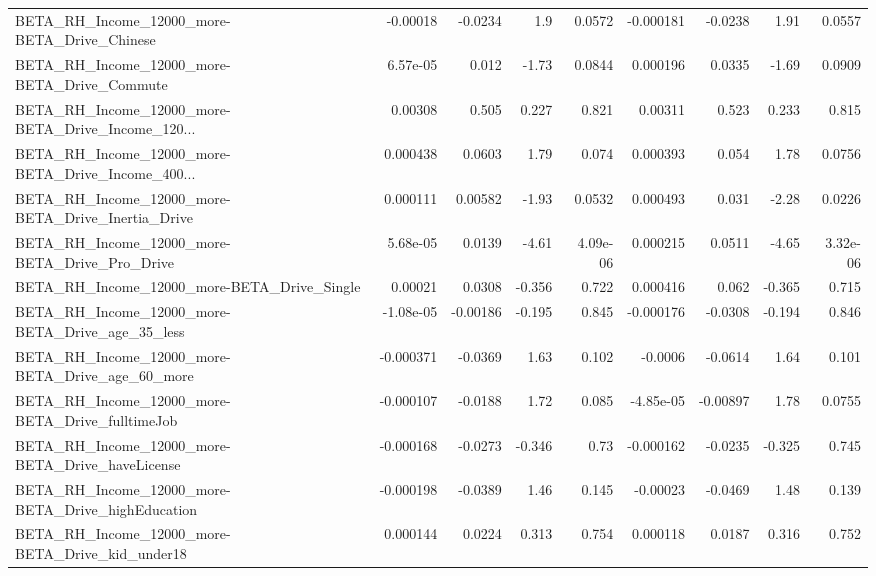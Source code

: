 \begin{tabular}{lrrrrrrrr}
BETA\_RH\_Income\_12000\_more-BETA\_Drive\_Chinese       &    -0.00018 &      -0.0234 &      1.9 &   0.0572 &  -0.000181 &     -0.0238 &         1.91 &        0.0557 \\
BETA\_RH\_Income\_12000\_more-BETA\_Drive\_Commute       &    6.57e-05 &        0.012 &    -1.73 &   0.0844 &   0.000196 &      0.0335 &        -1.69 &        0.0909 \\
BETA\_RH\_Income\_12000\_more-BETA\_Drive\_Income\_120... &     0.00308 &        0.505 &    0.227 &    0.821 &    0.00311 &       0.523 &        0.233 &         0.815 \\
BETA\_RH\_Income\_12000\_more-BETA\_Drive\_Income\_400... &    0.000438 &       0.0603 &     1.79 &    0.074 &   0.000393 &       0.054 &         1.78 &        0.0756 \\
BETA\_RH\_Income\_12000\_more-BETA\_Drive\_Inertia\_Drive &    0.000111 &      0.00582 &    -1.93 &   0.0532 &   0.000493 &       0.031 &        -2.28 &        0.0226 \\
BETA\_RH\_Income\_12000\_more-BETA\_Drive\_Pro\_Drive     &    5.68e-05 &       0.0139 &    -4.61 & 4.09e-06 &   0.000215 &      0.0511 &        -4.65 &      3.32e-06 \\
BETA\_RH\_Income\_12000\_more-BETA\_Drive\_Single        &     0.00021 &       0.0308 &   -0.356 &    0.722 &   0.000416 &       0.062 &       -0.365 &         0.715 \\
BETA\_RH\_Income\_12000\_more-BETA\_Drive\_age\_35\_less   &   -1.08e-05 &     -0.00186 &   -0.195 &    0.845 &  -0.000176 &     -0.0308 &       -0.194 &         0.846 \\
BETA\_RH\_Income\_12000\_more-BETA\_Drive\_age\_60\_more   &   -0.000371 &      -0.0369 &     1.63 &    0.102 &    -0.0006 &     -0.0614 &         1.64 &         0.101 \\
BETA\_RH\_Income\_12000\_more-BETA\_Drive\_fulltimeJob   &   -0.000107 &      -0.0188 &     1.72 &    0.085 &  -4.85e-05 &    -0.00897 &         1.78 &        0.0755 \\
BETA\_RH\_Income\_12000\_more-BETA\_Drive\_haveLicense   &   -0.000168 &      -0.0273 &   -0.346 &     0.73 &  -0.000162 &     -0.0235 &       -0.325 &         0.745 \\
BETA\_RH\_Income\_12000\_more-BETA\_Drive\_highEducation &   -0.000198 &      -0.0389 &     1.46 &    0.145 &   -0.00023 &     -0.0469 &         1.48 &         0.139 \\
BETA\_RH\_Income\_12000\_more-BETA\_Drive\_kid\_under18   &    0.000144 &       0.0224 &    0.313 &    0.754 &   0.000118 &      0.0187 &        0.316 &         0.752 \\

\end{tabular}
